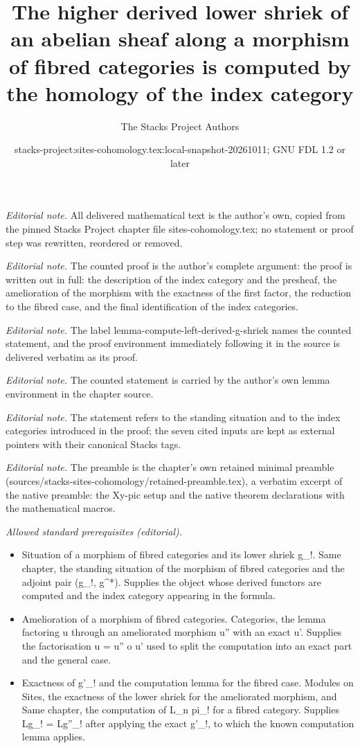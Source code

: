 \documentclass[10pt,a4paper]{amsart}
\title{The higher derived lower shriek of an abelian sheaf along a morphism of fibred categories is computed by the homology of the index category}
\author{The Stacks Project Authors}
\date{stacks-project:sites-cohomology.tex:local-snapshot-20261011; GNU FDL 1.2 or later}
\theoremstyle{plain}
\theoremstyle{definition}
\theoremstyle{remark}
\numberwithin{equation}{subsection}
\begin{document}
\maketitle
\noindent\textit{Editorial note.} All delivered mathematical text is the author's own, copied from the pinned Stacks Project chapter file sites-cohomology.tex; no statement or proof step was rewritten, reordered or removed.\par\medskip
\noindent\textit{Editorial note.} The counted proof is the author's complete argument: the proof is written out in full: the description of the index category and the presheaf, the amelioration of the morphism with the exactness of the first factor, the reduction to the fibred case, and the final identification of the index categories.\par\medskip
\noindent\textit{Editorial note.} The label lemma-compute-left-derived-g-shriek names the counted statement, and the proof environment immediately following it in the source is delivered verbatim as its proof.\par\medskip
\noindent\textit{Editorial note.} The counted statement is carried by the author's own lemma environment in the chapter source.\par\medskip
\noindent\textit{Editorial note.} The statement refers to the standing situation and to the index categories introduced in the proof; the seven cited inputs are kept as external pointers with their canonical Stacks tags.\par\medskip
\noindent\textit{Editorial note.} The preamble is the chapter's own retained minimal preamble (sources/stacks-sites-cohomology/retained-preamble.tex), a verbatim excerpt of the native preamble: the Xy-pic setup and the native theorem declarations with the mathematical macros.\par\medskip
\noindent\textit{Allowed standard prerequisites (editorial).}\begin{itemize}
\item Situation of a morphism of fibred categories and its lower shriek g\_!. Same chapter, the standing situation of the morphism of fibred categories and the adjoint pair (g\_!, g\textasciicircum{}*). Supplies the object whose derived functors are computed and the index category appearing in the formula.
\item Amelioration of a morphism of fibred categories. Categories, the lemma factoring u through an ameliorated morphism u'' with an exact u'. Supplies the factorisation u = u'' o u' used to split the computation into an exact part and the general case.
\item Exactness of g'\_! and the computation lemma for the fibred case. Modules on Sites, the exactness of the lower shriek for the ameliorated morphism, and Same chapter, the computation of L\_n pi\_! for a fibred category. Supplies Lg\_! = Lg''\_! after applying the exact g'\_!, to which the known computation lemma applies.
\end{itemize}\medskip
\end{document}
